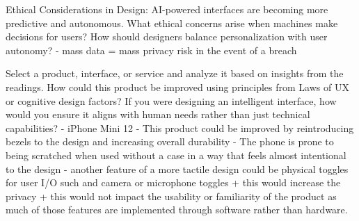 \documentclass[12pt]{article}
\begin{document}
    Ethical Considerations in Design: AI-powered interfaces are becoming more predictive and autonomous.
    What ethical concerns arise when machines make decisions for users? How should designers balance personalization with user autonomy?
        - mass data = mass privacy risk in the event of a breach
    
    Select a product, interface, or service and analyze it based on insights from the readings.
    How could this product be improved using principles from Laws of UX or cognitive design factors?
    If you were designing an intelligent interface, how would you ensure it aligns with human needs rather than just technical capabilities?
        - iPhone Mini 12
        - This product could be improved by reintroducing bezels to the design and increasing overall durability
        - The phone is prone to being scratched when used without a case in a way that feels almost intentional to the design
        - another feature of a more tactile design could be physical toggles for user I/O such and camera or microphone toggles
            + this would increase the privacy
            + this would not impact the usability or familiarity of the product as much
              of those features are implemented through software rather than hardware.
\end{document}
